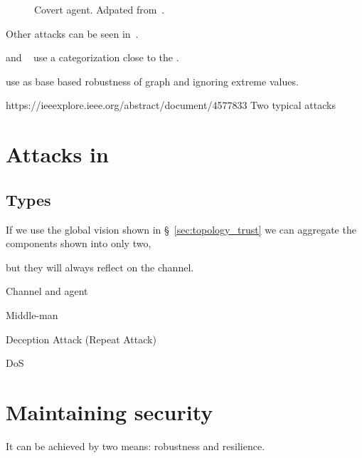 \documentclass[../main.tex]{subfiles}
\begin{document}
\begin{figure}[h]
\caption{Covert agent. Adpated from~\cite{Smith2015}.}\label{fig:covert_attack}
\end{figure}

Other attacks can be seen in~\cite{TeixeiraEtAl2015,ZhangEtAl2021c}.

\cite{DibajiEtAl2019} and ~ use a categorization close to the \CIA{}.

use as base
\cite{MaestreEtAl2018}
\cite{DibajiIshii2015,WangIshii2019,VelardeEtAl2018} based robustness of graph and ignoring extreme values.

https://ieeexplore.ieee.org/abstract/document/4577833
\cite{CaiEtAl2019,ZhangEtAl2021b}
Two typical attacks \cite{ZhangEtAl2021a}

\section{Attacks in \dmpc{}}\label{sec:attacks_in_dmpc}

\subsection{Types}\label{sec:types_of_attacks}
If we use the global vision shown in \S~\ref{sec:topology_trust} we can aggregate the components shown into only two,
\cite{PasqualettiEtAl2013}
\cite{BoemEtAl2020}

but they will always reflect on the channel.


Channel and agent

Middle-man

Deception Attack (Repeat Attack)

DoS

\cite{GuEtAl2016}

\section{Maintaining security}\label{sec:maintaining_security}
It can be achieved by two means: robustness and resilience.
\end{document}
